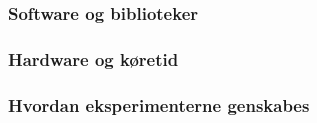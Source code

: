 
\subsubsection{Software og biblioteker}
\subsubsection{Hardware og køretid}
\subsubsection{Hvordan eksperimenterne genskabes}
